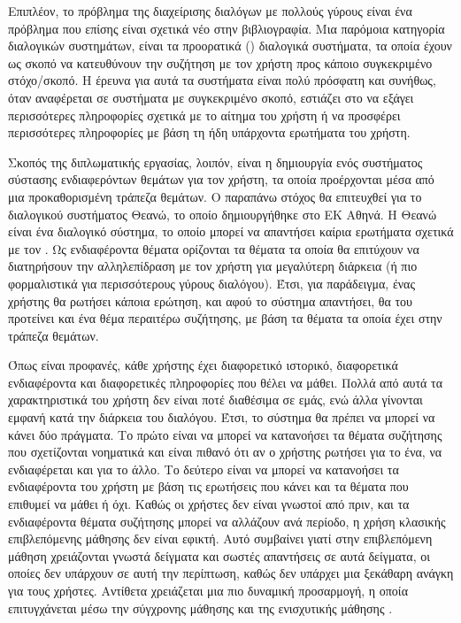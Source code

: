 Επιπλέον, το πρόβλημα της διαχείρισης διαλόγων με πολλούς γύρους είναι ένα πρόβλημα που επίσης είναι σχετικά νέο στην βιβλιογραφία\cite{yi2024surveyrecentadvancesllmbased}\cite{ni2022recentadvancesdeeplearning}.
Μια παρόμοια κατηγορία διαλογικών συστημάτων, είναι τα προορατικά () διαλογικά συστήματα, τα οποία έχουν ως σκοπό να κατευθύνουν την συζήτηση με τον χρήστη
προς κάποιο συγκεκριμένο στόχο/σκοπό. Η έρευνα για αυτά τα συστήματα είναι πολύ πρόσφατη και συνήθως, όταν αναφέρεται σε συστήματα με συγκεκριμένο σκοπό, εστιάζει στο
να εξάγει περισσότερες πληροφορίες σχετικά με το αίτημα του χρήστη ή να προσφέρει περισσότερες πληροφορίες με βάση τη ήδη υπάρχοντα ερωτήματα του χρήστη\cite{Deng2023ASO}.

Σκοπός της διπλωματικής εργασίας, λοιπόν, είναι η δημιουργία ενός συστήματος σύστασης ενδιαφερόντων θεμάτων για τον χρήστη, τα οποία προέρχονται μέσα από μια προκαθορισμένη τράπεζα θεμάτων.
Ο παραπάνω στόχος θα επιτευχθεί για το διαλογικού συστήματος Θεανώ, το οποίο δημιουργήθηκε στο ΕΚ Αθηνά.
Η Θεανώ είναι ένα διαλογικό σύστημα, το οποίο μπορεί να απαντήσει καίρια ερωτήματα σχετικά με τον .
Ως ενδιαφέροντα θέματα ορίζονται τα θέματα τα οποία θα επιτύχουν να διατηρήσουν την αλληλεπίδραση με τον χρήστη για μεγαλύτερη διάρκεια (ή πιο φορμαλιστικά για περισσότερους γύρους διαλόγου).
Έτσι, για παράδειγμα, ένας χρήστης θα ρωτήσει κάποια ερώτηση, και αφού το σύστημα απαντήσει,
θα του προτείνει και ένα θέμα περαιτέρω συζήτησης, με βάση τα θέματα τα οποία έχει στην τράπεζα θεμάτων.

Όπως είναι προφανές, κάθε χρήστης έχει διαφορετικό ιστορικό, διαφορετικά ενδιαφέροντα και διαφορετικές πληροφορίες που θέλει να μάθει.
Πολλά από αυτά τα χαρακτηριστικά του χρήστη δεν είναι ποτέ διαθέσιμα σε εμάς, ενώ άλλα γίνονται εμφανή κατά την διάρκεια του διαλόγου.
Έτσι, το σύστημα θα πρέπει να μπορεί να κάνει δύο πράγματα. Το πρώτο είναι να μπορεί να κατανοήσει τα θέματα συζήτησης που σχετίζονται νοηματικά και
είναι πιθανό ότι αν ο χρήστης ρωτήσει για το ένα, να ενδιαφέρεται και για το άλλο. Το δεύτερο είναι να μπορεί να κατανοήσει τα ενδιαφέροντα του χρήστη με βάση τις
ερωτήσεις που κάνει και τα θέματα που επιθυμεί να μάθει ή όχι. Καθώς οι χρήστες δεν είναι γνωστοί από πριν, και τα ενδιαφέροντα θέματα συζήτησης μπορεί να
αλλάζουν ανά περίοδο, η χρήση κλασικής επιβλεπόμενης μάθησης δεν είναι εφικτή. Αυτό συμβαίνει γιατί στην επιβλεπόμενη μάθηση χρειάζονται γνωστά
δείγματα και σωστές απαντήσεις σε αυτά δείγματα, οι οποίες δεν υπάρχουν σε αυτή την περίπτωση, καθώς δεν υπάρχει μια ξεκάθαρη ανάγκη για τους χρήστες.
Αντίθετα χρειάζεται μια πιο δυναμική προσαρμογή, η οποία επιτυγχάνεται μέσω την σύγχρονης μάθησης  και της ενισχυτικής μάθησης
.

